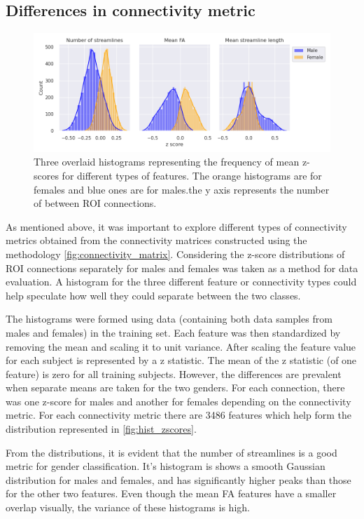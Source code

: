 \documentclass[msthesis.tex]{subfiles}
\begin{document}
\subsection{Differences in connectivity metric}
\label{subsec:connmetric}
\begin{figure}
    \centering
    \includegraphics[width=\textwidth]{images/zscoredist.png}
    \caption{Three overlaid histograms representing the frequency of mean z-scores for different types of features. The orange histograms are for females and blue ones are for males.the y axis represents the number of between ROI connections.}
    \label{fig:hist_zscores}
\end{figure} 
As mentioned above, it was important to explore different types of connectivity metrics obtained from the connectivity matrices constructed using the methodology \autoref{fig:connectivity_matrix}. Considering the z-score distributions of \gls{ROI} connections separately for males and females was taken as a method for data evaluation. A histogram for the three different feature or connectivity types could help speculate how well they could separate between the two classes.

The histograms were formed using data (containing both data samples from males and females) in the training set. Each feature was then standardized by removing the mean and scaling it to unit variance. After scaling the feature value for each subject is represented by a z statistic. The mean of the z statistic (of one feature) is zero for all training subjects. However, the differences are prevalent when separate means are taken for the two genders. For each connection, there was one z-score for males and another for females depending on the connectivity metric. For each connectivity metric there are 3486 features which help form the distribution represented in \autoref{fig:hist_zscores}.

From the distributions, it is evident that the number of streamlines is a good metric for gender classification. It's histogram is shows a smooth Gaussian distribution for males and females, and has significantly higher peaks than those for the other two features. Even though the mean FA features have a smaller overlap visually, the variance of these histograms is high.
\end{document}
